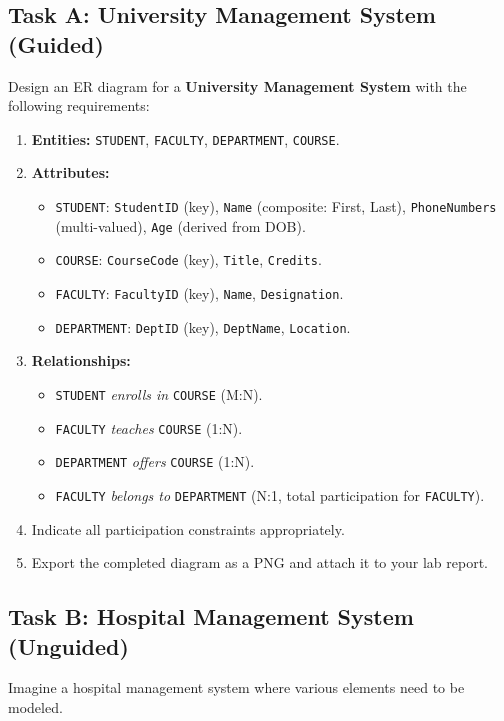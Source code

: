 \documentclass[12pt,a4paper]{article}
\begin{document}
\subsection*{Task A: University Management System (Guided)} 
Design an ER diagram for a \textbf{University Management System} with the following requirements:

\begin{enumerate}
    \item \textbf{Entities:} \texttt{STUDENT}, \texttt{FACULTY}, \texttt{DEPARTMENT}, \texttt{COURSE}.
    \item \textbf{Attributes:}
    \begin{itemize}
        \item \texttt{STUDENT}: \texttt{StudentID} (key), \texttt{Name} (composite: First, Last),
              \texttt{PhoneNumbers} (multi-valued), \texttt{Age} (derived from DOB).
        \item \texttt{COURSE}: \texttt{CourseCode} (key), \texttt{Title}, \texttt{Credits}.
        \item \texttt{FACULTY}: \texttt{FacultyID} (key), \texttt{Name}, \texttt{Designation}.
        \item \texttt{DEPARTMENT}: \texttt{DeptID} (key), \texttt{DeptName}, \texttt{Location}.
    \end{itemize}
    \item \textbf{Relationships:}
    \begin{itemize}
        \item \texttt{STUDENT} \textit{enrolls in} \texttt{COURSE} (M:N).
        \item \texttt{FACULTY} \textit{teaches} \texttt{COURSE} (1:N).
        \item \texttt{DEPARTMENT} \textit{offers} \texttt{COURSE} (1:N).
        \item \texttt{FACULTY} \textit{belongs to} \texttt{DEPARTMENT} (N:1, total participation
              for \texttt{FACULTY}).
    \end{itemize}
    \item Indicate all participation constraints appropriately.
    \item Export the completed diagram as a PNG and attach it to your lab report.
\end{enumerate}

\subsection*{Task B: Hospital Management System (Unguided)}
Imagine a hospital management system where various elements need to be modeled.
\end{document}
